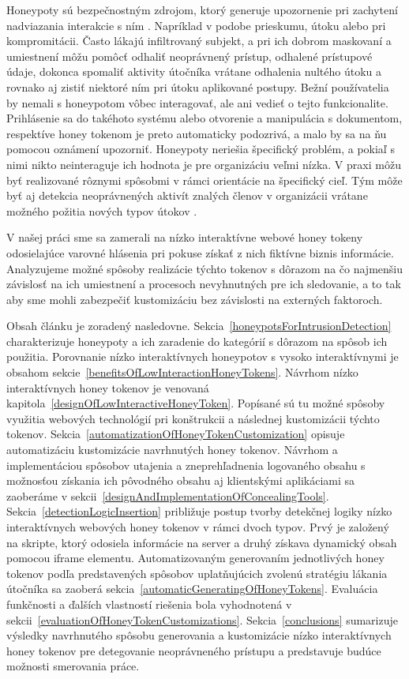 \documentclass[conference, 11pt,slovak,a4paper,twoside]{IEEEtran}
\begin{document}
Honeypoty sú bezpečnostným zdrojom, ktorý generuje upozornenie pri zachytení nadviazania interakcie s ním \cite{sanders_intrusion_2020}. Napríklad v podobe prieskumu, útoku alebo pri kompromitácii. Často lákajú infiltrovaný subjekt, a pri ich dobrom maskovaní a umiestnení môžu pomôcť odhaliť neoprávnený prístup, odhalené prístupové údaje, dokonca spomaliť aktivity útočníka vrátane odhalenia nultého útoku a rovnako aj zistiť niektoré ním pri útoku aplikované postupy. Bežní používatelia by nemali s honeypotom vôbec interagovať, ale ani vedieť o tejto funkcionalite. Prihlásenie sa do takéhoto systému alebo otvorenie a manipulácia s dokumentom, respektíve honey tokenom \cite{ng_honeypot_2018} je preto automaticky podozrivá, a malo by sa na ňu pomocou oznámení upozorniť. Honeypoty neriešia špecifický problém, a pokiaľ s nimi nikto neinteraguje ich hodnota je pre organizáciu veľmi nízka. V praxi môžu byť realizované rôznymi spôsobmi v rámci orientácie na špecifický cieľ. Tým môže byť aj detekcia neoprávnených aktivít znalých členov v organizácii vrátane možného požitia nových typov útokov \cite{spitzner_honeypots_2003}.

V našej práci sme sa zamerali na nízko interaktívne webové honey tokeny odosielajúce varovné hlásenia pri pokuse získať z nich fiktívne biznis informácie. Analyzujeme možné spôsoby realizácie týchto tokenov s dôrazom na čo najmenšiu závislosť na ich umiestnení a procesoch nevyhnutných pre ich sledovanie, a to tak aby sme mohli zabezpečiť kustomizáciu bez závislosti na externých faktoroch.

Obsah článku je zoradený nasledovne. Sekcia~\ref{honeypotsForIntrusionDetection} charakterizuje honeypoty a ich zaradenie do kategórií s dôrazom na spôsob ich použitia. Porovnanie nízko interaktívnych honeypotov s vysoko interaktívnymi je obsahom sekcie~\ref{benefitsOfLowInteractionHoneyTokens}. Návrhom nízko interaktívnych honey tokenov je venovaná kapitola~\ref{designOfLowInteractiveHoneyToken}. Popísané sú tu možné spôsoby využitia webových technológií pri konštrukcii a následnej kustomizácii týchto tokenov. Sekcia~\ref{automatizationOfHoneyTokenCustomization} opisuje automatizáciu kustomizácie navrhnutých honey tokenov.  Návrhom a implementáciou spôsobov utajenia a zneprehľadnenia logovaného obsahu s možnosťou získania ich pôvodného obsahu aj klientskými aplikáciami sa zaoberáme v sekcii~\ref{designAndImplementationOfConcealingTools}. Sekcia~\ref{detectionLogicInsertion} približuje postup tvorby detekčnej logiky nízko interaktívnych webových honey tokenov v rámci dvoch typov. Prvý je založený na skripte, ktorý odosiela informácie na server a druhý získava dynamický obsah pomocou iframe elementu. Automatizovaným generovaním jednotlivých honey tokenov podľa predstavených spôsobov uplatňujúcich zvolenú stratégiu lákania útočníka sa zaoberá sekcia~\ref{automaticGeneratingOfHoneyTokens}. Evaluácia funkčnosti a ďalších vlastností riešenia bola vyhodnotená v sekcii~\ref{evaluationOfHoneyTokenCustomizations}. Sekcia~\ref{conclusions} sumarizuje výsledky navrhnutého spôsobu generovania a kustomizácie nízko interaktívnych honey tokenov pre detegovanie neoprávneného prístupu a predstavuje budúce možnosti smerovania práce.
\end{document}
